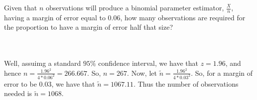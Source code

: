 Given that $n$ observations will produce a binomial parameter estimator, $\frac{X}{n}$, having a margin
of error equal to 0.06, how many observations are required for the proportion to have a margin of error
half that size?\\\\

\begin{solution}\renewcommand{\qedsymbol}{}\ \\
    Well, assuimg a standard $95\%$ confidence interval, we have that $z=1.96$, and hence
    $n=\frac{1.96^2}{4*0.06^2}=266.667$. So, $n=267$. Now, let $\tilde{n}=\frac{1.96^2}{4*0.03^2}$. So,
    for a margin of error to be 0.03, we have that $\tilde{n}=1067.11$. Thus the number of observations
    needed is $\tilde{n}=1068$.

\end{solution}
